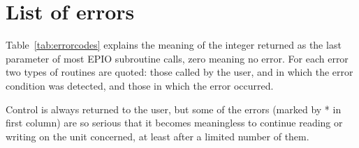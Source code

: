 \newpage
{}
\section{List of errors}

Table~\ref{tab:errorcodes} explains the meaning of the integer  
returned as the last parameter of most EPIO subroutine calls,
zero meaning no error.
For each error two types of routines are quoted: those called by the user,
and in which the error condition was detected, and those in which the
error occurred.
 
Control is always returned to the user, but some of the errors
(marked by * in first column) are so serious that it becomes meaningless
to continue reading or writing on the unit concerned,
at least after a limited number of them.

